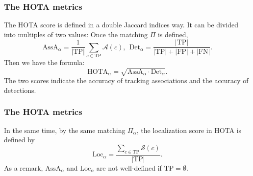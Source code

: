 \documentclass[slidetop, mathserif]{beamer}
\begin{document}
\begin{frame}
    \frametitle{The HOTA metrics}
    The HOTA score is defined in a double Jaccard indices way.
    It can be divided into multiples of two values:
    Once the matching $\Pi$ is defined,
    \[
        \text{AssA}_\alpha = \dfrac{1}{|\text{TP}|} \sum_{c\in\text{TP}} \mathcal A(c), \ \ 
        \text{Det}_\alpha = \dfrac{|\text{TP}|}{|\text{TP}| + |\text{FP}| + |\text{FN}|}.
    \]
    Then we have the formula:
    \[
        \text{HOTA}_\alpha = \sqrt{\text{AssA}_\alpha \cdot \text{Det}_\alpha}.
    \]
    The two scores indicate the accuracy of tracking associations and the accuracy of detections.
\end{frame}

\begin{frame}
    \frametitle{The HOTA metrics}

    In the same time, by the same matching $\Pi_\alpha$,
    the localization score in HOTA is defined by
    \[
        \text{Loc}_\alpha = \dfrac{\sum_{c\in\text{TP}} \mathcal S(c)}{|\text{TP}|}.
    \]
    As a remark, $\text{AssA}_\alpha$ and $\text{Loc}_\alpha$ are not well-defined
    if $\text{TP} = \emptyset$.

\end{frame}
\end{document}
